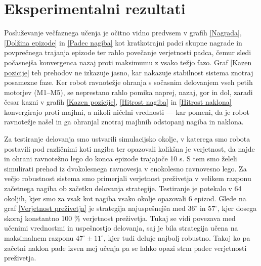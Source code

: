 \section{Eksperimentalni rezultati}
Posluževanje večfaznega učenja je očitno vidno predvsem v grafih \ref{Nagrada}, \ref{Dolžina epizode} in \ref{Padec nagiba} kot kratkotrajni padci skupne nagrade in povprečnega trajanja epizode ter rahlo povečanje verjetnosti padca, čemur sledi počasnejša konvergenca nazaj proti maksimumu z vsako težjo fazo. 
Graf \ref{Kazen pozicije} teh prehodov ne izkazuje jasno, kar nakazuje stabilnost sistema znotraj posamezne faze. Ker robot ravnotežje ohranja s sočasnim delovanjem vseh petih motorjev (M1–M5), se neprestano rahlo pomika naprej, nazaj, gor in dol, zaradi česar kazni v grafih \ref{Kazen pozicije}, \ref{Hitrost nagiba} in \ref{Hitrost naklona} konvergirajo proti majhni, a nikoli ničelni vrednosti — kar pomeni, da je robot ravnotežje našel in ga ohranjal znotraj majhnih odstopanj nagiba in naklona.

  Za testiranje delovanja smo ustvarili simulacijsko okolje, v katerega smo robota postavili pod različnimi koti nagiba ter opazovali kolikšna je verjetnost, da najde in ohrani ravnotežno lego do konca epizode trajajoče 10 s. S tem smo želeli simulirati prehod iz dvokolesnega ravnovesja v enokolesno ravnovesno lego. Za večjo robustnost sistema smo primerjali verjetnost preživetja v velikem razponu začetnega nagiba ob začetku delovanja strategije. Testiranje je potekalo v 64 okoljih, kjer smo za vsak kot nagiba vsako okolje opazovali 6 epizod. Glede na graf \ref{Verjetnost preživetja} je strategija najuspešnejša med $ 36^\circ $ in $ 57^\circ $, kjer dosega skoraj konstantno 100 \% verjetnost preživetja. Tukaj se vidi povezava med učenimi vrednostmi in uspešnostjo delovanja, saj je bila strategija učena na maksimalnem razponu $ 47^\circ \pm 11^\circ $, kjer tudi deluje najbolj robustno. Takoj ko pa začetni naklon pade izven mej učenja pa se lahko opazi strm padec verjetnosti preživetja.
